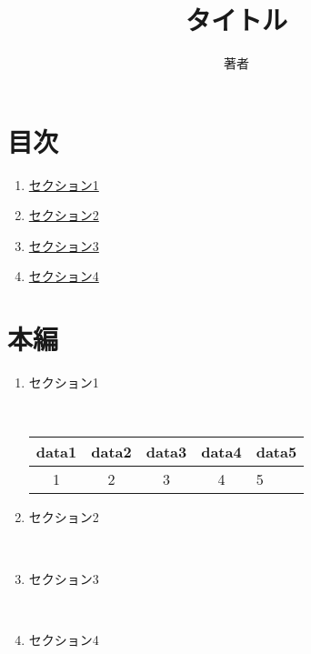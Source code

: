 \documentclass[12pt,a4paper,dvipdfmx]{jarticle}
\title{タイトル}
\author{著者}
\begin{document}
\maketitle
\section {目次}
\begin{enumerate}
	\item \hyperlink{section1}{セクション1}
	\item \hyperlink{section2}{セクション2}
	\item \hyperlink{section3}{セクション3}
	\item \hyperlink{section4}{セクション4}

\end{enumerate}
\section{本編}
		
		
		
\begin{enumerate}
	\item \hypertarget{section1}{セクション1}\\
	\begin{tabular}{ccccl}
	\hline
	data1 &data2& data3 & data4 & data5\\
	\hline
	1&2&3&4&5\\
	\hline
\end{tabular}
		
		
	\item \hypertarget{section2}{セクション2}\\
		
		
	\item \hypertarget{section3}{セクション3}\\
		
		
	\item \hypertarget{section4}{セクション4}\\
		
		
\end{enumerate}
\end{document}
